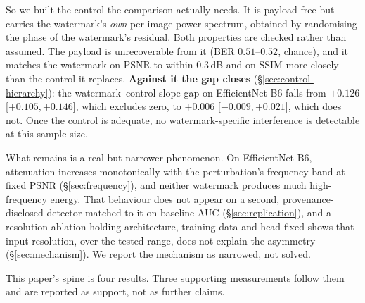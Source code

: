 \documentclass[journal]{IEEEtran}
\begin{document}
So we built the control the comparison actually needs. It is payload-free
but carries the watermark's \emph{own} per-image power spectrum, obtained by
randomising the phase of the watermark's residual. Both properties are
checked rather than assumed. The payload is unrecoverable from it (BER
$0.51$--$0.52$, chance), and it matches the watermark on PSNR to within
$0.3$\,dB and on SSIM more closely than the control it replaces.
\textbf{Against it the gap closes} (\S\ref{sec:control-hierarchy}): the
watermark--control slope gap on EfficientNet-B6 falls from $+0.126$
[$+0.105,+0.146$], which excludes zero, to $+0.006$ [$-0.009,+0.021$], which
does not. Once the control is adequate, no watermark-specific interference is
detectable at this sample size.

What remains is a real but narrower phenomenon. On EfficientNet-B6,
attenuation increases monotonically with the perturbation's frequency band
at fixed PSNR (\S\ref{sec:frequency}), and neither watermark produces much
high-frequency energy. That behaviour does not appear on a second,
provenance-disclosed detector matched to it on baseline AUC
(\S\ref{sec:replication}), and a resolution ablation holding architecture,
training data and head fixed shows that input resolution, over the tested
range, does not explain the asymmetry (\S\ref{sec:mechanism}). We report the
mechanism as narrowed, not solved.

This paper's spine is four results. Three supporting measurements follow
them and are reported as support, not as further claims.
\end{document}
